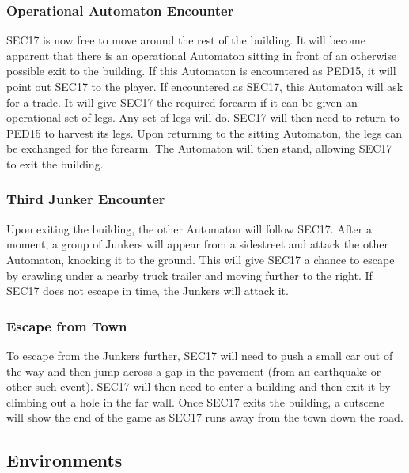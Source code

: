 \documentclass[journal]{IEEEtran}
\begin{document}
\subsubsection{Operational Automaton Encounter}
SEC17 is now free to move around the rest of the building. It will become apparent that there is an operational Automaton sitting in front of an otherwise possible exit to the building. If this Automaton is encountered as PED15, it will point out SEC17 to the player. If encountered as SEC17, this Automaton will ask for a trade. It will give SEC17 the required forearm if it can be given an operational set of legs. Any set of legs will do. SEC17 will then need to return to PED15 to harvest its legs. Upon returning to the sitting Automaton, the legs can be exchanged for the forearm. The Automaton will then stand, allowing SEC17 to exit the building.
\subsubsection{Third Junker Encounter}
Upon exiting the building, the other Automaton will follow SEC17. After a moment, a group of Junkers will appear from a sidestreet and attack the other Automaton, knocking it to the ground. This will give SEC17 a chance to escape by crawling under a nearby truck trailer and moving further to the right. If SEC17 does not escape in time, the Junkers will attack it.
\subsubsection{Escape from Town}
To escape from the Junkers further, SEC17 will need to push a small car out of the way and then jump across a gap in the pavement (from an earthquake or other such event). SEC17 will then need to enter a building and then exit it by climbing out a hole in the far wall. Once SEC17 exits the building, a cutscene will show the end of the game as SEC17 runs away from the town down the road.
\subsection{Environments}
\end{document}
